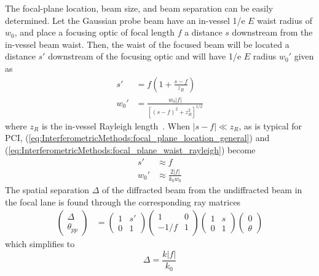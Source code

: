 The focal-plane location, beam size, and beam separation
can be easily determined.
Let the Gaussian probe beam have
an in-vessel 1/e $E$ waist radius of $w_0$,
and place a focusing optic of focal length $f$
a distance $s$ downstream from the in-vessel beam waist.
Then, the waist of the focused beam
will be located a distance $s'$ downstream of the focusing optic
and will have 1/e $E$ radius $w_0'$ given as
\begin{align}
  s' &= f \left( 1 + \frac{s - f}{z_R} \right)
  \label{eq:InterferometricMethods:focal_plane_location_general}
  \\
  w_0' &= \frac{w_0 |f|}{\left[ (s - f)^2 + z_R^2 \right]^{1/2}}
  \label{eq:InterferometricMethods:focal_plane_waist_general}
\end{align}
where $z_R$ is the in-vessel Rayleigh length~\cite{self83}.
When $|s - f| \ll z_R$, as is typical for PCI,
(\ref{eq:InterferometricMethods:focal_plane_location_general}) and
(\ref{eq:InterferometricMethods:focal_plane_waist_rayleigh}) become
\graffito{\textcolor{red}{%
  Simple optics gives correct $s'$, but
  Gaussian beam physics needed for $w_0'$}
}%
\begin{align}
  s' &\approx f
  \label{eq:InterferometricMethods:focal_plane_location_rayleigh}
  \\
  w_0' &\approx \frac{2 |f|}{k_0 w_0}
  \label{eq:InterferometricMethods:focal_plane_waist_rayleigh}
\end{align}
The spatial separation $\Delta$
of the diffracted beam from the undiffracted beam
in the focal lane is found through the corresponding ray matrices
\begin{align}
  \begin{pmatrix}
    \Delta
    \\
    \theta_{pp}
  \end{pmatrix}
  &=
  \begin{pmatrix}
    1 & s'
    \\
    0 & 1
  \end{pmatrix}
  \begin{pmatrix}
    1      & 0
    \\
    -1 / f & 1
  \end{pmatrix}
  \begin{pmatrix}
    1 & s
    \\
    0 & 1
  \end{pmatrix}
  \begin{pmatrix}
    0
    \\
    \theta
  \end{pmatrix}
\end{align}
which simplifies to
\begin{equation}
  \Delta
  =
  \frac{k |f|}{k_0}
  \label{eq:InterferometricMethods:phase_plate_beam_separation}
\end{equation}


